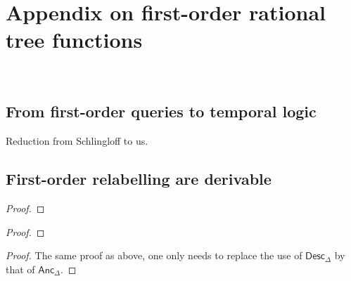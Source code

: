 

\section{Appendix on first-order rational tree functions}~\label{sec:AppendixForat}

\subsection{From first-order queries to temporal logic}
Reduction from Schlingloff to us.

\subsection{First-order relabelling are derivable}

\begin{lemma}\label{lem:nextmod}
\end{lemma}
\begin{proof}
\end{proof}

\begin{lemma}\label{lem:untilmod}
\end{lemma}
\begin{proof}
\end{proof}


\begin{lemma}\label{lem:sincemod}

\end{lemma}
\begin{proof}
The same proof as above, one only needs to replace the use of $\mathsf{Desc}_\Delta$ by that of $\mathsf{Anc}_\Delta$.
\end{proof}

